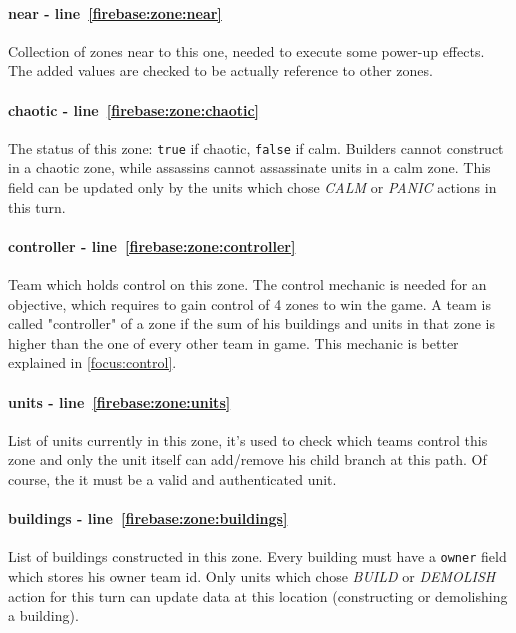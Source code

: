 			\paragraph{near - line~\ref{firebase:zone:near}}
			Collection of zones near to this one, needed to execute some power-up effects.
			The added values are checked to be actually reference to other zones.
			
			\paragraph{chaotic - line~\ref{firebase:zone:chaotic}}
			The status of this zone: \lstinline|true| if chaotic, \lstinline|false| if calm. Builders cannot construct in a chaotic zone, while assassins cannot assassinate units in a calm zone. This field can be updated only by the units which chose \emph{CALM} or \emph{PANIC} actions in this turn.
			
			\paragraph{controller - line~\ref{firebase:zone:controller}}
			Team which holds control on this zone. The control mechanic is needed for an objective, which requires to gain control of 4 zones to win the game. A team is called "controller" of a zone if the sum of his buildings and units in that zone is higher than the one of every other team in game. This mechanic is better explained in \autoref{focus:control}.
			
			\paragraph{units - line~\ref{firebase:zone:units}}
			List of units currently in this zone, it's used to check which teams control this zone and only the unit itself can add/remove his child branch at this path. Of course, the it must be a valid and authenticated unit.
			
			\paragraph{buildings - line~\ref{firebase:zone:buildings}}
			List of buildings constructed in this zone. Every building must have a \lstinline|owner| field which stores his owner team id. Only units which chose \emph{BUILD} or \emph{DEMOLISH} action for this turn can update data at this location (constructing or demolishing a building).
			
